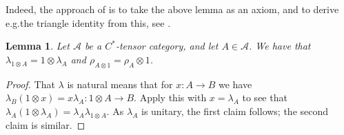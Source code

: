 \documentclass[a4paper,11pt]{article}
\theoremstyle{plain}
\newtheorem{lemma}[proposition]{Lemma}
\theoremstyle{remark}
\newcommand{\mc}[1]{\mathcal{#1}}
\begin{document}
Indeed, the approach of \cite{EGNO_TensorCategories} is to take the above lemma as an axiom, and to derive e.g.\@ the triangle identity from this, see \cite[Section~2.2]{EGNO_TensorCategories}.

\begin{lemma}\label{lem:unit_unit_one_side}
Let $\mc A$ be a $C^*$-tensor category, and let $A\in\mc A$.  We have that $\lambda_{1\otimes A} = 1 \otimes \lambda_A$ and $\rho_{A\otimes 1} = \rho_A \otimes 1$.
\end{lemma}
\begin{proof}
That $\lambda$ is natural means that for $x\colon A\to B$ we have $\lambda_B(1\otimes x) = x \lambda_A \colon 1\otimes A \to B$.  Apply this with $x=\lambda_A$ to see that $\lambda_A(1\otimes\lambda_A) = \lambda_A \lambda_{1\otimes A}$.  As $\lambda_A$ is unitary, the first claim follows; the second claim is similar.
\end{proof}
\end{document}
